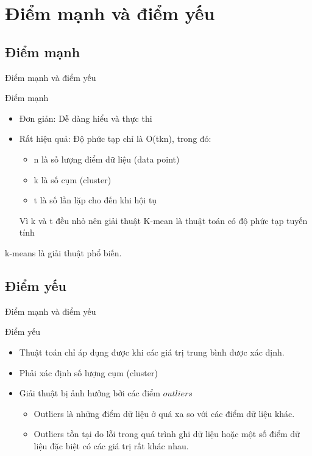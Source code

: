 \documentclass[english,10pt,table]{beamer}
\begin{document}
\section{Điểm mạnh và điểm yếu}
\subsection{Điểm mạnh}
\begin{frame}{Điểm mạnh và điểm yếu}
\begin{block} {Điểm mạnh}
	\begin{itemize}
		\item Đơn giản: Dễ dàng hiểu và thực thi
		\item Rất hiệu quả: Độ phức tạp chỉ là O(tkn), trong đó: 
			\begin{itemize}
				\item n là số lượng điểm dữ liệu (data point)
				\item k là số cụm (cluster)
				\item t là số lần lặp cho đến khi hội tụ
			\end{itemize}
		Vì k và t đều nhỏ nên giải thuật K-mean là thuật toán có độ phức tạp tuyến tính
	\end{itemize}
	
\end{block}
	k-means là giải thuật phổ biến.
\end{frame}

\subsection{Điểm yếu}
\begin{frame}{Điểm mạnh và điểm yếu}
\begin{block} {Điểm yếu}
	\begin{itemize}
		\item Thuật toán chỉ áp dụng được khi các giá trị trung bình được xác định.
		\item Phải xác định số lượng cụm (cluster)
		\item Giải thuật bị ảnh hưởng bởi các điểm \alert{$outliers$}
			\begin{itemize}
			\item Outliers là những điểm dữ liệu ở quá xa so với các điểm dữ liệu khác.
			\item Outliers tồn tại do lỗi trong quá trình ghi dữ liệu hoặc một số điểm dữ liệu đặc biệt có các giá trị rất khác nhau.
			\end{itemize}
	\end{itemize}
\end{block}
\end{frame}
\end{document}
